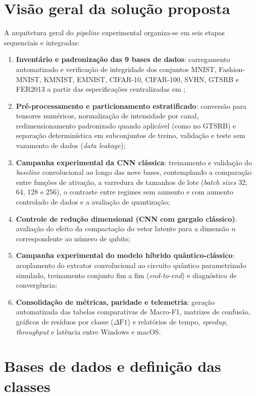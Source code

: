\documentclass[
    12pt,
    openright,
    oneside,
    a4paper,
    english,
    brazil
]{abntex2}
\begin{document}
\section{Visão geral da solução proposta}
\label{subsec:visao_arquitetura}

A arquitetura geral do \textit{pipeline} experimental organiza-se em seis etapas sequenciais e integradas:
\begin{enumerate}
    \item \textbf{Inventário e padronização das 9 bases de dados}: carregamento automatizado e verificação de integridade dos conjuntos MNIST, Fashion-MNIST, KMNIST, EMNIST, CIFAR-10, CIFAR-100, SVHN, GTSRB e FER2013 a partir das especificações centralizadas em ;
    \item \textbf{Pré-processamento e particionamento estratificado}: conversão para tensores numéricos, normalização de intensidade por canal, redimensionamento padronizado quando aplicável (como no GTSRB) e separação determinística em subconjuntos de treino, validação e teste sem vazamento de dados (\textit{data leakage});
    \item \textbf{Campanha experimental da CNN clássica}: treinamento e validação do \textit{baseline} convolucional ao longo das nove bases, contemplando a comparação entre funções de ativação, a varredura de tamanhos de lote (\textit{batch sizes} 32, 64, 128 e 256), o contraste entre regimes sem aumento e com aumento controlado de dados e a avaliação de quantização;
    \item \textbf{Controle de redução dimensional (CNN com gargalo clássico)}: avaliação do efeito da compactação do vetor latente para a dimensão \(n\) correspondente ao número de qubits;
    \item \textbf{Campanha experimental do modelo híbrido quântico-clássico}: acoplamento do extrator convolucional ao circuito quântico parametrizado simulado, treinamento conjunto fim a fim (\textit{end-to-end}) e diagnóstico de convergência;
    \item \textbf{Consolidação de métricas, paridade e telemetria}: geração automatizada das tabelas comparativas de Macro-F1, matrizes de confusão, gráficos de resíduos por classe (\(\Delta\text{F1}\)) e relatórios de tempo, \textit{speedup}, \textit{throughput} e latência entre Windows e macOS.
\end{enumerate}

\section{Bases de dados e definição das classes}
\end{document}
